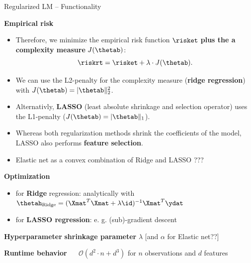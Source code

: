 \documentclass[11pt,compress,t,notes=noshow, xcolor=table]{beamer}
\newcommand{\highlight}[1]{\textcolor{highlightcol}{\textbf{#1}}}
\begin{document}
\begin{frame}{Regularized LM -- Functionality}

\footnotesize

\highlight{Empirical risk}

\begin{itemize}

\item Therefore, we minimize the empirical risk function $\risket$ \textbf{plus the a complexity measure} $J(\thetab)$:
  $$
  \riskrt = \risket + \lambda \cdot J(\thetab). 
  $$ 
  
\item We can use the L2-penalty for the complexity measure (\textbf{ridge regression}) with $J(\thetab) = |\thetab\|_2^2 $. 

\item Alternativly, \textbf{LASSO} (least absolute shrinkage and selection operator) uses the L1-penalty ($J(\thetab) = |\thetab\|_1 $).

\item Whereas both regularization methods shrink the coefficients of the model, LASSO also performs \textbf{feature selection}. 

\item Elastic net as a convex combination of Ridge and LASSO ???
  
  
\end{itemize}





\medskip

\highlight{Optimization} ~~
\begin{itemize}\footnotesize
  \item for \textbf{Ridge} regression: analytically with $\thetah_{\text{Ridge}} = (\Xmat^T \Xmat  + \lambda \id)^{-1} \Xmat^T\ydat$
  \item for \textbf{LASSO regression}: e. g. (sub)-gradient descent
\end{itemize}

\medskip

\highlight{Hyperparameter} \textbf{shrinkage parameter} $\lambda$ [and $\alpha$ for Elastic net??] \\

\medskip

\highlight{Runtime behavior} ~~ $\mathcal{O}(d^2 \cdot n + d^3)$ for $n$ 
observations and $d$ features 

\end{frame}
\end{document}

